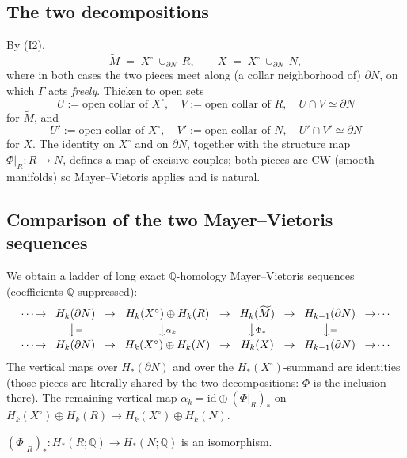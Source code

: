 \documentclass[12pt]{article}
\begin{document}
\subsection*{The two decompositions}
By (I2),
\[
  \widetilde M \;=\; X^\circ\ \cup_{\partial N}\ R,
  \qquad
  X \;=\; X^\circ\ \cup_{\partial N}\ N ,
\]
where in both cases the two pieces meet along (a collar neighborhood of)
$\partial N$, on which $\Gamma$ acts \emph{freely}. Thicken to open sets
\[
  U:=\text{open collar of }X^\circ,\quad
  V:=\text{open collar of }R,\quad
  U\cap V\simeq \partial N
\]
for $\widetilde M$, and
\[
  U':=\text{open collar of }X^\circ,\quad
  V':=\text{open collar of }N,\quad
  U'\cap V'\simeq \partial N
\]
for $X$. The identity on $X^\circ$ and on $\partial N$, together with the
structure map $\Phi|_R:R\to N$, defines a map of excisive couples; both pieces
are CW (smooth manifolds) so Mayer--Vietoris applies and is natural.

\subsection*{Comparison of the two Mayer--Vietoris sequences}
We obtain a ladder of long exact $\mathbb{Q}$-homology Mayer--Vietoris
sequences (coefficients $\mathbb{Q}$ suppressed):
\begin{equation}\label{eq:ladder}
\begin{array}{ccccccccc}
\cdots\!\to\! & H_k(\partial N) & \!\to\! & H_k(X^\circ)\oplus H_k(R) & \!\to\! & H_k(\widetilde M) & \!\to\! & H_{k-1}(\partial N) & \!\to\!\cdots\\[2pt]
& \big\downarrow{\scriptstyle =} & & \big\downarrow{\scriptstyle \alpha_k} & & \big\downarrow{\scriptstyle \Phi_*} & & \big\downarrow{\scriptstyle =} &\\[2pt]
\cdots\!\to\! & H_k(\partial N) & \!\to\! & H_k(X^\circ)\oplus H_k(N) & \!\to\! & H_k(X) & \!\to\! & H_{k-1}(\partial N) & \!\to\!\cdots
\end{array}
\end{equation}
The vertical maps over $H_*(\partial N)$ and over the $H_*(X^\circ)$-summand
are identities (those pieces are literally shared by the two decompositions:
$\Phi$ is the inclusion there). The remaining vertical map
$\alpha_k=\mathrm{id}\oplus(\Phi|_R)_*$ on $H_k(X^\circ)\oplus H_k(R)\to
H_k(X^\circ)\oplus H_k(N)$.

\begin{claim}\label{cl:Rtildem}
$(\Phi|_R)_*:H_*(R;\mathbb{Q})\to H_*(N;\mathbb{Q})$ is an isomorphism.
\end{claim}
\end{document}
